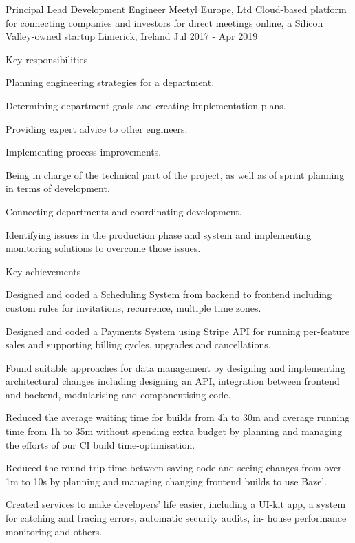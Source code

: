 \begin{cventries}
    \cventry
    {Principal Lead Development Engineer} %
    {Meetyl Europe, Ltd} %
    {Cloud-based platform for connecting companies and investors for direct meetings online, a Silicon Valley-owned startup} %
    {Limerick, Ireland} %
    {Jul 2017 - Apr 2019} %
    {
        \begin{cvitems}{Key responsibilities}
            \item {Planning engineering strategies for a department.}
            \item {Determining department goals and creating implementation plans.}
            \item {Providing expert advice to other engineers.}
            \item {Implementing process improvements.}
            \item {Being in charge of the technical part of the project, as well as of sprint planning in terms of development.}
            \item {Connecting departments and coordinating development.}
            \item {Identifying issues in the production phase and system and implementing monitoring solutions to overcome those issues.}
        \end{cvitems}
        \begin{cvitems}{Key achievements}
            \item {Designed and coded a Scheduling System from backend to frontend including custom rules for invitations, recurrence, multiple time zones.}
            \item {Designed and coded a Payments System using Stripe API for running per-feature sales and supporting billing cycles, upgrades and cancellations.}
            \item {Found suitable approaches for data management by designing and implementing architectural changes including designing an API, integration between frontend and backend, modularising and componentising code.}
            \item {Reduced the average waiting time for builds from 4h to 30m and average running time from 1h to 35m without spending extra budget by planning and managing the efforts of our CI build time-optimisation.}
            \item {Reduced the round-trip time between saving code and seeing changes from over 1m to 10s by planning and managing changing frontend builds to use Bazel.}
            \item {Created services to make developers’ life easier, including a UI-kit app, a system for catching and tracing errors, automatic security audits, in- house performance monitoring and others.}
        \end{cvitems}
    }


\end{cventries}
